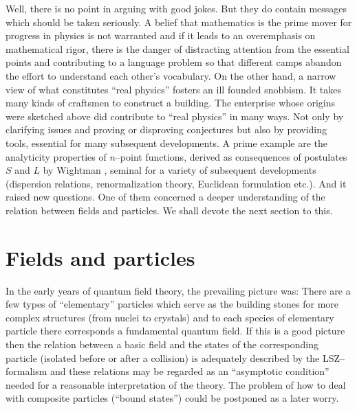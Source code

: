 Well, there is no point in arguing with good jokes. 
But they do contain messages which should be taken seriously.
A belief that mathematics is the prime mover for 
progress in physics is not warranted and if it leads to an 
overemphasis on mathematical rigor, there is the 
danger of distracting attention from the essential points
and contributing to a language problem so that different camps
abandon the effort to understand each other's vocabulary.
On the other hand, a narrow
view of what constitutes ``real physics'' fosters an ill founded 
snobbism. It takes many kinds of craftsmen to construct a building.
The enterprise whose origins were sketched above did contribute 
to ``real physics'' in many ways. 
Not only by clarifying issues and proving or disproving 
conjectures but also by providing tools, essential for many 
subsequent developments. A prime example are the 
analyticity properties of $n$--point functions, derived as
consequences of postulates $S$ and $L$ by Wightman \cite{Wig},
seminal for a variety of subsequent developments
(dispersion relations, renormalization theory, Euclidean 
formulation etc.).  
And it raised new questions. One of them concerned a deeper
understanding of the relation between fields and particles.
We shall devote the next section to this. 

\section{Fields and particles}
\setcounter{equation}{0}
In the early years of quantum field theory, the prevailing picture was:
There are a few types of ``elementary'' particles which serve as the
building stones for more complex structures (from nuclei to crystals)
and to each species of elementary particle there corresponds a
fundamental quantum field. If this is a good picture then the
relation between a basic field and the states of the corresponding
particle (isolated before or after a collision) is adequately
described by the LSZ--formalism and these relations may be regarded as
an ``asymptotic condition'' needed for a reasonable interpretation of
the theory. The problem of how to deal with composite particles
(``bound states'') could be postponed as a later worry.

